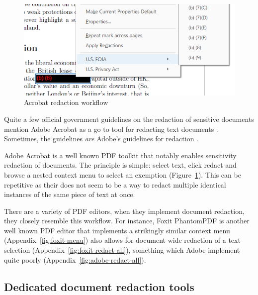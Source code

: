 \documentclass[\version]{l4proj}
\begin{document}
\begin{figure}
    \includegraphics[width=\linewidth]{images/related_products/adobe_redaction.png}
    \caption{Acrobat redaction workflow}\label{fig:adobe-redaction}
    \vspace{-15pt}
\end{figure}

Quite a few official government guidelines on the redaction of sensitive documents mention Adobe Acrobat as a go to tool for redacting text documents \autocite{thenationalarchivesRedactionToolkitPaper2016}.
Sometimes, the guidelines \textit{are} Adobe's guidelines for redaction \autocite{scottishgovernmentRedactingInformation2019}.

Adobe Acrobat is a well known PDF toolkit that notably enables sensitivity redaction of documents.
The principle is simple: select text, click redact and browse a nested context menu to select an exemption (Figure~\ref{fig:adobe-redaction}).
This can be repetitive as their does not seem to be a way to redact multiple identical instances of the same piece of text at once.

There are a variety of PDF editors, when they implement document redaction, they closely resemble this workflow.
For instance, Foxit PhantomPDF is another well known PDF editor that implements a strikingly similar context menu (Appendix~\ref{fig:foxit-menu}) also allows for document wide redaction of a text selection (Appendix~\ref{fig:foxit-redact-all}), something which Adobe implement quite poorly (Appendix~\ref{fig:adobe-redact-all}).

\subsection{Dedicated document redaction tools}
\end{document}
